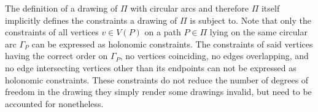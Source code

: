 The definition of a drawing of ${\Pi}$ with circular arcs \emdash and therefore ${\Pi}$ itself \emdash implicitly defines the constraints a drawing of ${\Pi}$ is subject to. Note that only the constraints of all vertices ${v \in V(P)}$ on a path ${P \in \Pi}$ lying on the same circular arc ${\Gamma_P}$ can be expressed as holonomic constraints. The constraints of said vertices having the correct order on ${\Gamma_P}$, no vertices coinciding, no edges overlapping, and no edge intersecting vertices other than its endpoints can not be expressed as holonomic constraints. These constraints do not reduce the number of degrees of freedom in the drawing \emdash they simply render some drawings invalid, but need to be accounted for nonetheless.



\clearpage


\clearpage


\clearpage


\clearpage


\clearpage


\clearpage


\clearpage


